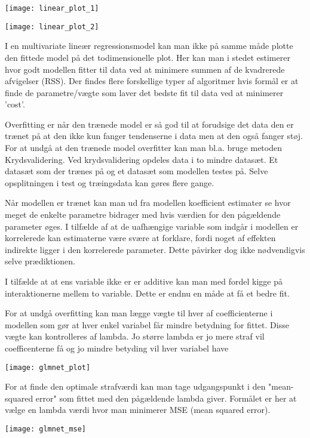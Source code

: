 \documentclass{report}
\begin{document}
\texttt{[image: linear\_plot\_1]}

\texttt{[image: linear\_plot\_2]}

I en multivariate lineær regressionsmodel kan man ikke på samme måde plotte den fittede model på
det todimensionelle plot. Her kan man i stedet estimerer hvor godt modellen fitter til data ved at
minimere summen af de kvadrerede afvigelser (RSS). 
Der findes flere forskellige typer af algoritmer hvis formål er at finde de parametre/vægte som
laver det bedste fit til data ved at minimerer 'cost'. 

Overfitting er når den trænede model er så god til at forudsige det data den er trænet på at den
ikke kun fanger tendenserne i data men at den også fanger støj. For at undgå at den trænede model
overfitter kan man bl.a. bruge metoden Krydsvalidering. Ved krydsvalidering opdeles data i to
mindre datasæt. Et datasæt som der trænes på og et datasæt som modellen testes på. Selve
opsplitningen i test og træingsdata kan gøres flere gange.

Når modellen er trænet kan man ud fra modellen koefficient estimater se hvor meget de enkelte
parametre bidrager med hvis værdien for den pågældende parameter øges. 
I tilfælde af at de uafhængige variable som indgår i modellen er korrelerede kan estimaterne være
svære at forklare, fordi noget af effekten indirekte ligger i den korrelerede parameter. Dette
påvirker dog ikke nødvendigvis selve prædiktionen. 

I tilfælde at at ens variable ikke er er additive kan man med fordel kigge på interaktionerne
mellem to variable. Dette er endnu en måde at få et bedre fit.

For at undgå overfitting kan man lægge vægte til hver af coefficienterne i modellen som gør at hver enkel variabel får mindre betydning for fittet. Disse vægte kan kontrolleres af lambda. 
Jo større lambda er jo mere straf vil coefficenterne få og jo mindre betyding vil hver variabel have

\texttt{[image: glmnet\_plot]}

For at finde den optimale strafværdi kan man tage udgangspunkt i den "mean-squared error" som fittet med den pågældende lambda giver. 
Formålet er her at vælge en lambda værdi hvor man minimerer MSE (mean squared error). 

\texttt{[image: glmnet\_mse]}
\end{document}
